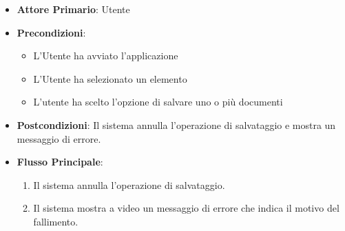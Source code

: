 \begin{itemize}
    \item \textbf{Attore Primario}: Utente
    \item \textbf{Precondizioni}: 
    \begin{itemize}
        \item L'Utente ha avviato l'applicazione
        \item L'Utente ha selezionato un elemento
        \item L'utente ha scelto l'opzione di salvare uno o più documenti
    \end{itemize}
    \item \textbf{Postcondizioni}: Il sistema annulla l'operazione di salvataggio e mostra un messaggio di errore.
    \item \textbf{Flusso Principale}:
        \begin{enumerate}
            \item Il sistema annulla l'operazione di salvataggio.
            \item Il sistema mostra a video un messaggio di errore che indica il motivo del fallimento.
        \end{enumerate}
\end{itemize}